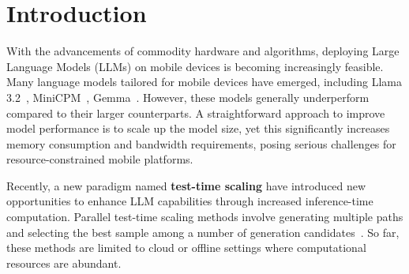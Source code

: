 \section{Introduction}


With the advancements of commodity hardware and algorithms, deploying Large Language Models (LLMs) on mobile devices is becoming increasingly feasible. Many language models tailored for mobile devices have emerged, including Llama 3.2~\cite{llama32}, MiniCPM~\cite{minicpm,minicpm-v}, Gemma~\cite{gemma1,gemma3}. However, these models generally underperform compared to their larger counterparts. A straightforward approach to improve model performance is to scale up the model size, yet this significantly increases memory consumption and bandwidth requirements, posing serious challenges for resource-constrained mobile platforms.


Recently, a new paradigm named \textbf{test-time scaling} have introduced new opportunities to enhance LLM capabilities through increased inference-time computation. Parallel test-time scaling methods involve generating multiple paths and selecting the best sample among a number of generation candidates~\cite{cot-sc,wu2024inference,snell2024scaling,huggingface2025testtime,brown2024large,liu2025can1bsurpass405b,tts-survey,chen2025sets}. So far, these methods are limited to cloud or offline settings where computational resources are abundant.

